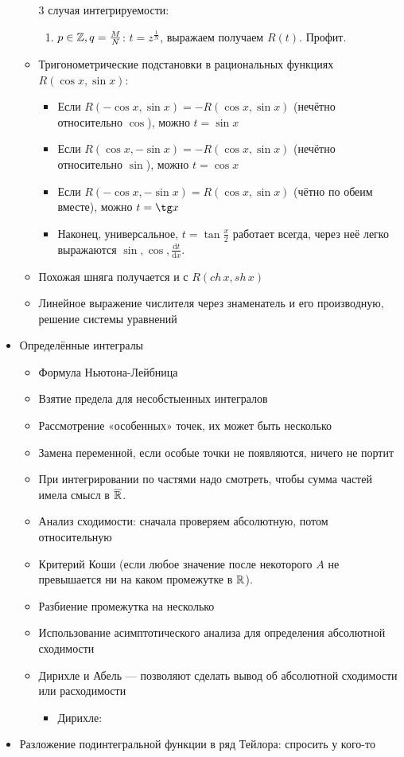 \documentclass[12pt, a4paper]{article}
\begin{document}
\begin{itemize}
\begin{itemize}
      3 случая интегрируемости:
      \begin{enumerate}
        \item $p \in {\mathbb{Z}}, q = \frac{M}{N}$: $t = z^{\frac{1}{N}}$, выражаем получаем $R(t)$. Профит.
      \end{enumerate}
      \item Тригонометрические подстановки в рациональных функциях $R(\cos x, \sin x)$:
      \begin{itemize}
        \item Если $R(-\cos x, \sin x) = -R(\cos x, \sin x)$ (нечётно относительно $\cos$), можно $t = \sin x$
        \item Если $R(\cos x, -\sin x) = -R(\cos x, \sin x)$ (нечётно относительно $\sin$), можно $t = \cos x$
        \item Если $R(-\cos x, -\sin x) = R(\cos x, \sin x)$ (чётно по обеим вместе), можно $t = \tg x$
        \item Наконец, универсальное, $t = \tan \frac{x}{2}$ работает всегда, через неё легко выражаются $\sin, \cos, \frac{\mathrm{d}t}{\mathrm{d}x}$.
      \end{itemize}
      \item Похожая шняга получается и с $R(ch\, x, sh\, x)$
      \item Линейное выражение числителя через знаменатель и его производную, решение системы уравнений
    \end{itemize}
    \item Определённые интегралы
    \begin{itemize}
      \item Формула Ньютона-Лейбница
      \item Взятие предела для несобстыенных интегралов
      \item Рассмотрение «особенных» точек, их может быть несколько
      \item Замена переменной, если особые точки не появляются, ничего не портит
      \item При интегрировании по частями надо смотреть, чтобы сумма частей имела смысл в $\overline{{\mathbb{R}}}$.
      \item Анализ сходимости: сначала проверяем абсолютную, потом относительную
      \item Критерий Коши (если любое значение после некоторого $A$ не превышается ни на каком промежутке в ${\mathbb{R}}$).
      \item Разбиение промежутка на несколько
      \item Использование асимптотического анализа для определения абсолютной сходимости
      \item Дирихле и Абель — позволяют сделать вывод об абсолютной сходимости или расходимости
        \begin{itemize}
          \item Дирихле: 
        \end{itemize}
    \end{itemize}
    \item Разложение подинтегральной функции в ряд Тейлора: спросить у кого-то
  \end{itemize}
\end{document}
